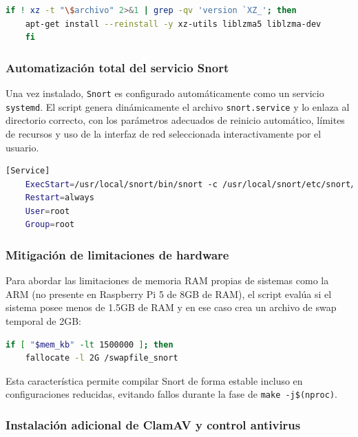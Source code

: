 \documentclass[11pt,a4paper,twoside]{report}
\begin{document}
\begin{lstlisting}[language=bash, caption={Validación e instalación segura de paquetes xz}, label="lst:xz"]
	if ! xz -t "\$archivo" 2>&1 | grep -qv 'version `XZ_'; then
	apt-get install --reinstall -y xz-utils liblzma5 liblzma-dev
	fi
\end{lstlisting}

\subsubsection{Automatización total del servicio Snort}

Una vez instalado, \texttt{Snort} es configurado automáticamente como un servicio \texttt{systemd}. El script genera dinámicamente el archivo \texttt{snort.service} y lo enlaza al directorio correcto, con los parámetros adecuados de reinicio automático, límites de recursos y uso de la interfaz de red seleccionada interactivamente por el usuario.

\begin{lstlisting}[language=bash, caption={Sección relevante del systemd generado}, label=lst:systemd]
	[Service]
	ExecStart=/usr/local/snort/bin/snort -c /usr/local/snort/etc/snort/snort.lua -i eth0 -A alert_fast
	Restart=always
	User=root
	Group=root
\end{lstlisting}

\subsubsection{Mitigación de limitaciones de hardware}

Para abordar las limitaciones de memoria RAM propias de sistemas como la ARM (no presente en Raspberry Pi 5 de 8GB de RAM), el script evalúa si el sistema posee menos de 1.5GB de RAM y en ese caso crea un archivo de swap temporal de 2GB:

\begin{lstlisting}[language=bash]
	if [ "$mem_kb" -lt 1500000 ]; then
	fallocate -l 2G /swapfile_snort
\end{lstlisting}

Esta característica permite compilar Snort de forma estable incluso en configuraciones reducidas, evitando fallos durante la fase de \texttt{make -j\$(nproc)}.

\subsubsection{Instalación adicional de ClamAV y control antivirus}
\end{document}
